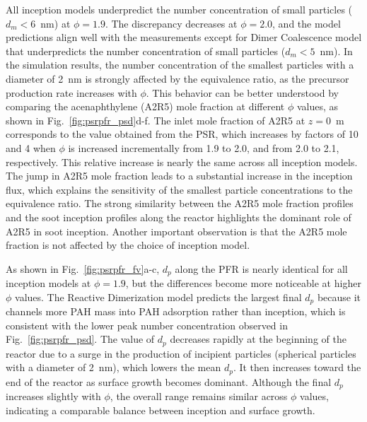 All inception models underpredict the number concentration of small particles ($d_m < 6$~nm) at $\phi = 1.9$. The discrepancy decreases at $\phi = 2.0$, and the model predictions align well with the measurements except for Dimer Coalescence model that underpredicts the number concentration of small particles ($d_m<5$~nm). In the simulation results, the number concentration of the smallest particles with a diameter of 2~nm is strongly affected by the equivalence ratio, as the precursor production rate increases with $\phi$. This behavior can be better understood by comparing the acenaphthylene (A2R5) mole fraction at different $\phi$ values, as shown in Fig.~\ref{fig:psrpfr_psd}d-f. The inlet mole fraction of A2R5 at $z = 0$~m corresponds to the value obtained from the PSR, which increases by factors of 10 and 4 when $\phi$ is increased incrementally from 1.9 to 2.0, and from 2.0 to 2.1, respectively. This relative increase is nearly the same across all inception models. The jump in A2R5 mole fraction leads to a substantial increase in the inception flux, which explains the sensitivity of the smallest particle concentrations to the equivalence ratio. The strong similarity between the A2R5 mole fraction profiles and the soot inception profiles along the reactor highlights the dominant role of A2R5 in soot inception. Another important observation is that the A2R5 mole fraction is not affected by the choice of inception model.


As shown in Fig.~\ref{fig:psrpfr_fv}a-c, $d_p$ along the PFR is nearly identical for all inception models at $\phi = 1.9$, but the differences become more noticeable at higher $\phi$ values. The Reactive Dimerization model predicts the largest final $d_p$ because it channels more PAH mass into PAH adsorption rather than inception, which is consistent with the lower peak number concentration observed in Fig.~\ref{fig:psrpfr_psd}. The value of $d_p$ decreases rapidly at the beginning of the reactor due to a surge in the production of incipient particles (spherical particles with a diameter of 2~nm), which lowers the mean $d_p$. It then increases toward the end of the reactor as surface growth becomes dominant. Although the final $d_p$ increases slightly with $\phi$, the overall range remains similar across $\phi$ values, indicating a comparable balance between inception and surface growth. 

